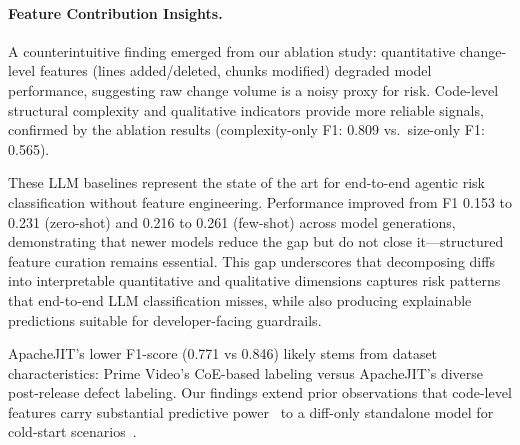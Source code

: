 \paragraph{Feature Contribution Insights.}
A counterintuitive finding emerged from our ablation study: quantitative change-level features (lines added/deleted, chunks modified) degraded model performance, suggesting raw change volume is a noisy proxy for risk. Code-level structural complexity and qualitative indicators provide more reliable signals, confirmed by the ablation results (complexity-only F1: 0.809 vs.\ size-only F1: 0.565).

These LLM baselines represent the state of the art for end-to-end agentic risk classification without feature engineering. Performance improved from F1 0.153 to 0.231 (zero-shot) and 0.216 to 0.261 (few-shot) across model generations, demonstrating that newer models reduce the gap but do not close it---structured feature curation remains essential. This gap underscores that decomposing diffs into interpretable quantitative and qualitative dimensions captures risk patterns that end-to-end LLM classification misses, while also producing explainable predictions suitable for developer-facing guardrails.

ApacheJIT's lower F1-score (0.771 vs 0.846) likely stems from dataset characteristics: Prime Video's CoE-based labeling versus ApacheJIT's diverse post-release defect labeling. Our findings extend prior observations that code-level features carry substantial predictive power~\cite{kamei2012large,hoang2019deepjit} to a diff-only standalone model for cold-start scenarios~\cite{fukushima2014cross,liu2025human}.

